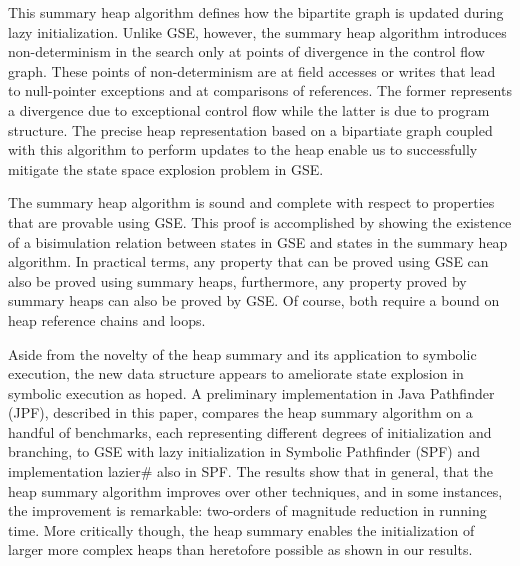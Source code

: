 This summary heap algorithm defines how the bipartite graph is updated during lazy initialization. Unlike GSE, however, the summary heap algorithm introduces non-determinism in the search only at points of divergence in the control flow graph. These points of non-determinism are at field accesses or writes that lead to null-pointer exceptions and at comparisons of references. The former represents a divergence due to exceptional control flow while the latter is due to program structure. The precise heap representation based on a bipartiate graph coupled with this algorithm to perform updates to the heap enable us to successfully mitigate the state space explosion problem in GSE.        

The summary heap algorithm is sound and complete with respect to
properties that are provable using GSE. This proof is accomplished by
showing the existence of a bisimulation relation between states in GSE
and states in the summary heap algorithm. In practical terms, any
property that can be proved using GSE can also be proved using summary
heaps, furthermore, any property proved by summary heaps can also be
proved by GSE. Of course, both require a bound on heap reference
chains and loops.

Aside from the novelty of the heap summary and its application to
symbolic execution, the new data structure appears to ameliorate state
explosion in symbolic execution as hoped. A preliminary implementation in Java
Pathfinder (JPF), described in this paper, compares the heap summary
algorithm on a handful of benchmarks, each representing different
degrees of initialization and branching, to GSE with lazy
initialization in Symbolic Pathfinder (SPF) and implementation
lazier\# also in SPF. The results show that in general, that the heap
summary algorithm improves over other techniques, and in some
instances, the improvement is remarkable: two-orders of magnitude
reduction in running time. More critically though, the heap summary
enables the initialization of larger more complex heaps than
heretofore possible as shown in our results.



\begin{comment}
We implement the summary heap algorithm as an extension to \emph{Java
  PathFinder} (JPF) and compare it to GSE with lazy initialization in
\emph{Symbolic Pathfinder (SPF)} and an implementation of lazier\#
initialization in SPF.  The comparison shows on some examples up to a two-order of magnitude
reduction in the total time taken to explore the same state space
defined by the bound on the longest heap reference chain.  For these
examples, we show that where other GSE approaches are unable to
complete exploration within the provided time bound, the summary heap
finishes exploration in a few seconds.
\end{comment}


